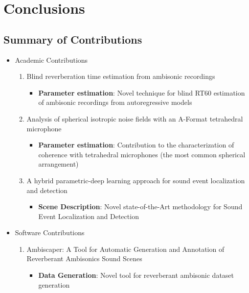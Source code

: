\chapter{Conclusions}


\section{Summary of Contributions}


\begin{itemize}
  \item Academic Contributions
  
  \begin{enumerate}
  
  
  	  \item Blind reverberation time estimation from ambisonic recordings 
  	\begin{itemize}
  		\item \textbf{Parameter estimation}: Novel technique for blind RT60 estimation of ambisonic recordings from autoregressive models
	\end{itemize}

  
  	\item Analysis of spherical isotropic noise fields with an A-Format tetrahedral microphone 
  	\begin{itemize}
  		\item \textbf{Parameter estimation}: Contribution to the characterization of coherence with tetrahedral microphones (the most common spherical arrangement)
	\end{itemize}


  	\item A hybrid parametric-deep learning approach for sound event localization and detection 
  	\begin{itemize}
  		\item \textbf{Scene Description}: Novel state-of-the-Art methodology for Sound Event Localization and Detection	
  	\end{itemize}

  \end{enumerate}

  \item Software Contributions

	\begin{enumerate}
	
  		\item Ambiscaper: A Tool for Automatic Generation and Annotation of Reverberant Ambisonics Sound Scenes 
  		\begin{itemize}
  			\item \textbf{Data Generation}: Novel tool for reverberant ambisonic dataset generation
		\end{itemize}


\end{enumerate}
\end{itemize}
